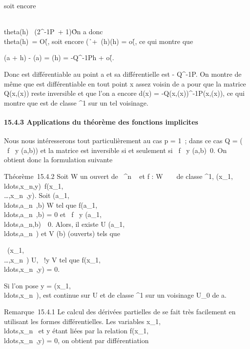 \documentclass[]{article}
\begin{document}
soit encore

\\theta(h)\ \leq
(2\Q^-1P\ +
1)\h\.

On a donc \\theta(h)\ =
O(\h\), soit encore
(\h\
+\ \theta(h)\)\eta(h) =
o(\h\), ce qui montre
que

\phi(a + h) - \phi(a) = \theta(h) = -Q^-1Ph +
o(\h\).

Donc \phi est différentiable au point a et sa différentielle est -
Q^-1P. On montre de même que \phi est différentiable en tout
point x assez voisin de a pour que la matrice Q(x,\phi(x)) reste inversible
et que l'on a encore d\phi(x) = -Q(x,\phi(x))^-1P(x,\phi(x)), ce qui
montre que \phi est de classe \mathcal{C}^1 sur un tel voisinage.

\paragraph{15.4.3 Applications du théorème des fonctions implicites}

Nous nous intéresserons tout particulièrement au cas p = 1~; dans ce cas
Q = \left (\matrix\, \partial~f
\over \partial~y (a,b)\right ) et la matrice
est inversible si et seulement si  \partial~f \over \partial~y
(a,b)\neq~0. On obtient donc la formulation
suivante

Théorème~15.4.2 Soit W un ouvert de ~^n \times {}~ et f : W \rightarrow~ ~ de
classe \mathcal{C}^1,
(x_1,\\ldots,x_n,y)\mapsto~f(x_1,\\\ldots,x_n~,y).
Soit
(a_1,\\ldots,a_n~,b)
\in W tel que
f(a_1,\\ldots,a_n~,b)
= 0 et  \partial~f \over \partial~y
(a_1,\\ldots,a_n,b)\mathrel\neq~~0.
Alors, il existe U
\inV(a_1,\\ldots,a_n~)
et V \inV(b) (ouverts) tels que

\forall~(x_1,\\\ldots,x_n~)
\in U, \exists~!y \in V \text tel que
f(x_1,\\ldots,x_n~,y)
= 0.

Si l'on pose y =
\phi(x_1,\\ldots,x_n~),
\phi est continue sur U et de classe ^1 sur un voisinage
U_0 de a.

Remarque~15.4.1 Le calcul des dérivées partielles de \phi se fait très
facilement en utilisant les formes différentielles. Les variables
x_1,\\ldots,x_n~
et y étant liées par la relation
f(x_1,\\ldots,x_n~,y)
= 0, on obtient par différentiation
\end{document}
